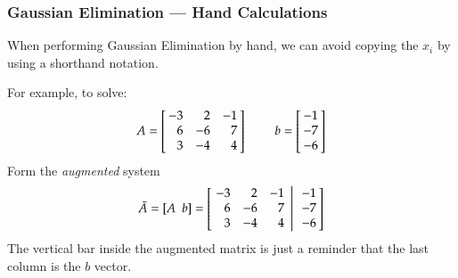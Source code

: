 \documentclass[10pt]{beamer}
\begin{document}
\begin{frame}
\frametitle{Gaussian Elimination --- Hand Calculations}

When performing Gaussian Elimination by hand, we can avoid
copying the $x_i$ by using a shorthand notation.

For example, to solve:
\begin{equation*}
    A = \left[\negthickspace\begin{array}{rrr} -3 &  2 & -1  \\
                                                6 & -6 &  7 \\
                                                3 & -4 &  4 \end{array}\negthickspace\right]
    \ \ \ \ \ \ \ \ \
    b = \left[\negthickspace\begin{array}{r} -1 \\ -7 \\ -6 \end{array}\negthickspace\right]
\end{equation*}
Form the \emph{augmented} system
\begin{equation*}
    \tilde{A} = \left[ A\ \ b \right] =
      \left[
           \left.\negthickspace\begin{array}{rrr}  -3 &  2 & -1  \\
                                                    6 & -6 &  7 \\
                                                    3 & -4 &  4 \end{array}
           \right|\begin{array}{r} -1 \\ -7 \\ -6 \end{array}\negthickspace\right]
\end{equation*}
The vertical bar inside the augmented matrix is just
a reminder that the last column is the $b$ vector.


\end{frame}
\end{document}
